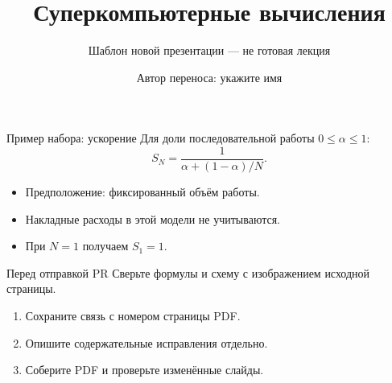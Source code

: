 \documentclass[aspectratio=169,11pt]{beamer}
\title{Суперкомпьютерные вычисления}
\subtitle{Шаблон новой презентации — не готовая лекция}
\author{Автор переноса: укажите имя}
\date{}
\begin{document}
\begin{frame}
  \titlepage
\end{frame}
\begin{frame}{Пример набора: ускорение}
  Для доли последовательной работы $0\leq\alpha\leq1$:
  \[
    S_N=\frac{1}{\alpha+(1-\alpha)/N}.
  \]
  \begin{itemize}
    \item Предположение: фиксированный объём работы.
    \item Накладные расходы в этой модели не учитываются.
    \item При $N=1$ получаем $S_1=1$.
  \end{itemize}
\end{frame}
\begin{frame}{Перед отправкой PR}
  Сверьте формулы и схему с изображением исходной страницы.
  \begin{enumerate}
    \item Сохраните связь с номером страницы PDF.
    \item Опишите содержательные исправления отдельно.
    \item Соберите PDF и проверьте изменённые слайды.
  \end{enumerate}
\end{frame}
\end{document}

